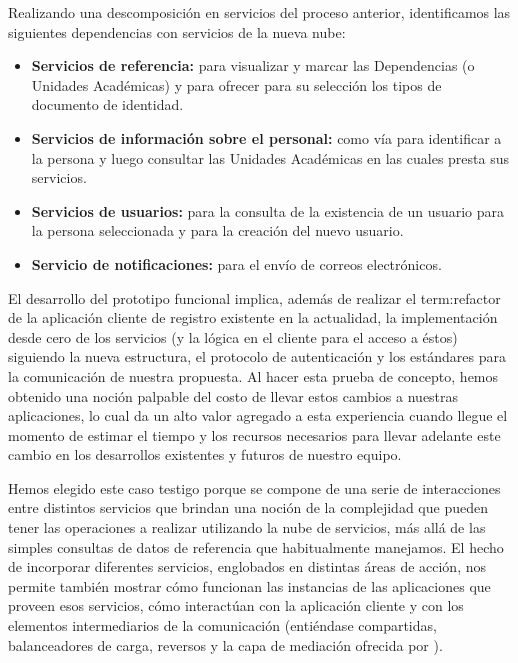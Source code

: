 Realizando una descomposición en servicios del proceso anterior, identificamos las siguientes dependencias con servicios de la nueva nube:

\begin{itemize}
  \item \textbf{Servicios de referencia:} para visualizar y marcar las Dependencias (o Unidades Académicas) y para ofrecer para su selección los tipos de documento de identidad.
  \item \textbf{Servicios de información sobre el personal:} como vía para identificar a la persona y luego consultar las Unidades Académicas en las cuales presta sus servicios.
  \item \textbf{Servicios de usuarios:} para la consulta de la existencia de un usuario para la persona seleccionada y para la creación del nuevo usuario.
  \item \textbf{Servicio de notificaciones:} para el envío de correos electrónicos.
\end{itemize}

El desarrollo del prototipo funcional implica, además de realizar el \gls{term:refactor} de la aplicación cliente de registro existente en la actualidad, la implementación desde cero de los servicios (y la lógica en el cliente para el acceso a éstos) siguiendo la nueva estructura, el protocolo de autenticación y los estándares para la comunicación de nuestra propuesta. Al hacer esta prueba de concepto, hemos obtenido  una noción palpable del costo de llevar estos cambios a nuestras aplicaciones, lo cual da un alto valor agregado a esta experiencia cuando llegue el momento de estimar el tiempo y los recursos necesarios para llevar adelante este cambio en los desarrollos existentes y futuros de nuestro equipo.

Hemos elegido este caso testigo porque se compone de una serie de interacciones entre distintos servicios que brindan una noción de la complejidad que pueden tener las operaciones a realizar utilizando la nube de servicios, más allá de las simples consultas de datos de referencia que habitualmente manejamos. El hecho de incorporar diferentes servicios, englobados en distintas áreas de acción, nos permite también mostrar cómo funcionan las instancias de las aplicaciones que proveen esos servicios, cómo interactúan con la aplicación cliente y con los elementos intermediarios de la comunicación (entiéndase  compartidas, balanceadores de carga,  reversos y la capa de mediación ofrecida por ).

